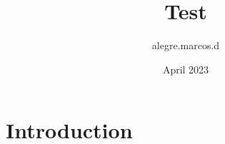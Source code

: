\documentclass{article}
\title{Test}
\author{alegre.marcos.d }
\date{April 2023}
\begin{document}
\maketitle

\section{Introduction}
\end{document}

